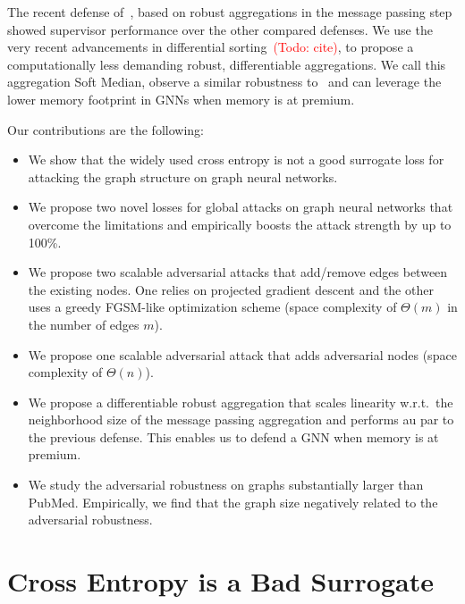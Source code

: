 \documentclass[sigconf,authordraft]{acmart}
\newcommand{\todo}[1]{\textcolor{red}{(Todo: #1)}}
\begin{document}
The recent defense of~\citet{Geisler2020}, based on robust aggregations in the message passing step showed supervisor performance over the other compared defenses. We use the very recent advancements in differential sorting~\todo{cite}, to propose a computationally less demanding robust, differentiable aggregations. We call this aggregation Soft Median, observe a similar robustness to~\citep{Geisler2020} and can leverage the lower memory footprint in GNNs when memory is at premium.

Our contributions are the following:
\begin{itemize}
  \item We show that the widely used cross entropy is not a good surrogate loss for attacking the graph structure on graph neural networks.
  \item We propose two novel losses for global attacks on graph neural networks that overcome the limitations and empirically boosts the attack strength by up to 100\%.
  \item We propose two scalable adversarial attacks that add/remove edges between the existing nodes. One relies on projected gradient descent and the other uses a greedy FGSM-like optimization scheme (space complexity of \(\Theta(m)\) in the number of edges \(m\)).
  \item We propose one scalable adversarial attack that adds adversarial nodes (space complexity of \(\Theta(n)\)).
  \item We propose a differentiable robust aggregation that scales linearity w.r.t.\ the neighborhood size of the message passing aggregation and performs au par to the previous defense. This enables us to defend a GNN when memory is at premium.
  \item We study the adversarial robustness on graphs substantially larger than PubMed. Empirically, we find that the graph size negatively related to the adversarial robustness.
\end{itemize}

\section{Cross Entropy is a Bad Surrogate}\label{sec:ceisbad} %
\end{document}
